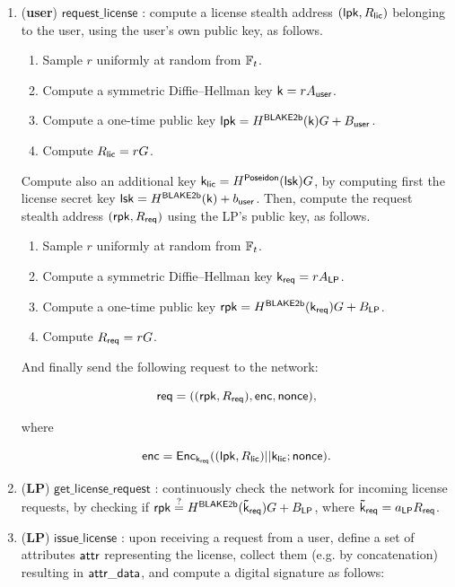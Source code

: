 \begin{enumerate}
	\item (\textbf{user}) $\mathsf{request\_license}$ : compute a license stealth address $(\mathsf{lpk}, R_{\mathsf{lic}})$ belonging to the user, using the user's own public key, as follows.

	\begin{enumerate}
		\item Sample $r$ uniformly at random from $\mathbb{F}_t$.
		\item Compute a symmetric Diffie--Hellman key $\mathsf{k} = rA_{\mathsf{user}}$.
		\item Compute a one-time public key $\mathsf{lpk} = H^\mathsf{BLAKE2b}(\mathsf{k})G + B_{\mathsf{user}}$.
		\item Compute $R_{\mathsf{lic}} = rG$.
	\end{enumerate}

	Compute also an additional key $\mathsf{k_{lic}} = H^\mathsf{Poseidon}(\mathsf{lsk})G$, by computing first the license secret key $\mathsf{lsk} = H^\mathsf{BLAKE2b}(\mathsf{k}) + b_{\mathsf{user}}$. Then, compute the request stealth address $(\mathsf{rpk}, R_{\mathsf{req}})$ using the LP's public key, as follows.

	\begin{enumerate}
		\item Sample $r$ uniformly at random from $\mathbb{F}_t$.
		\item Compute a symmetric Diffie--Hellman key $\mathsf{k_{req}} = rA_{\mathsf{LP}}$.
		\item Compute a one-time public key $\mathsf{rpk} = H^\mathsf{BLAKE2b}(\mathsf{k_{req}})G + B_{\mathsf{LP}}$.
		\item Compute $R_{\mathsf{req}} = rG$.
	\end{enumerate}

	And finally send the following request to the network:

		$$\mathsf{req} = ((\mathsf{rpk}, R_{\mathsf{req}}), \mathsf{enc}, \mathsf{nonce}),$$

	where 

		$$\mathsf{enc} = \mathsf{Enc}_{\mathsf{k_{req}}} ((\mathsf{lpk}, R_{\mathsf{lic}})||\mathsf{k_{lic}}; \mathsf{nonce}).$$


	\item (\textbf{LP}) $\mathsf{get\_license\_request}$ : continuously check the network for incoming license requests, by checking if $\mathsf{rpk} \stackrel{?}{=} H^\mathsf{BLAKE2b}(\mathsf{\tilde{k}_{req}}) G + B_{\mathsf{LP}}$, where $\mathsf{\tilde{k}_{req}} = a_{\mathsf{LP}}R_{\mathsf{req}}$.

	\item (\textbf{LP}) $\mathsf{issue\_license}$ : upon receiving a request from a user, define a set of attributes $\mathsf{attr}$ representing the license, collect them (e.g. by concatenation) resulting in $\mathsf{attr\_data}$, and compute a digital signature as follows:


\end{enumerate}
